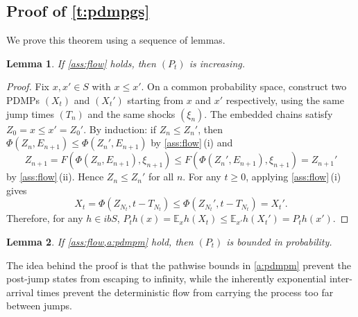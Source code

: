 \documentclass[12pt,reqno]{amsart}
\numberwithin{equation}{section}
\newtheorem{lemma}{Lemma}[section]
\theoremstyle{definition}
\newcommand{\1}{\mathbbm{1}}
\newcommand{\EE}{\mathbb E}
\begin{document}
\subsection{Proof of \texorpdfstring{\cref{t:pdmpgs}}{Theorem \ref{t:pdmpgs}}}\label{ss:pdmpgsproof}

We prove this theorem using a sequence of lemmas.

\begin{lemma}\label{l:pdmpinc}
    If \cref{ass:flow} holds, then $(P_t)$ is increasing.
\end{lemma}

\begin{proof}
    Fix $x, x' \in S$ with $x \leq x'$.  On a common probability space,
    construct two PDMPs $(X_t)$ and $(X_t')$ starting from $x$ and $x'$
    respectively, using the same jump times $(T_n)$ and the same shocks
    $(\xi_n)$.  The embedded chains satisfy $Z_0 = x \leq x' = Z_0'$.
    By induction: if $Z_n \leq Z_n'$, then $\Phi(Z_n, E_{n+1}) \leq
    \Phi(Z_n', E_{n+1})$ by \cref{ass:flow}\,(i) and
    \begin{equation*}
        Z_{n+1}
        = F(\Phi(Z_n, E_{n+1}), \xi_{n+1})
        \leq F(\Phi(Z_n', E_{n+1}), \xi_{n+1})
        = Z_{n+1}'
    \end{equation*}
    by \cref{ass:flow}\,(ii).  Hence $Z_n \leq Z_n'$ for all $n$.
    For any $t \geq 0$, applying \cref{ass:flow}\,(i) gives
    \begin{equation*}
        X_t = \Phi(Z_{N_t}, t - T_{N_t}) \leq \Phi(Z_{N_t}', t - T_{N_t}) = X_t'.
    \end{equation*}
    Therefore, for any $h \in ibS$,
    $P_t h(x) = \EE_x h(X_t) \leq \EE_{x'} h(X_t') = P_t h(x')$.
\end{proof}

\begin{lemma}\label{p:pdmpbinp}
    If \cref{ass:flow,a:pdmpm} hold, then $(P_t)$ is bounded in probability.
\end{lemma}

The idea behind the proof is that the pathwise bounds in \cref{a:pdmpm} prevent
the post-jump states from escaping to infinity, while the inherently exponential
inter-arrival times prevent the deterministic flow from carrying the process too
far between jumps.
\end{document}
